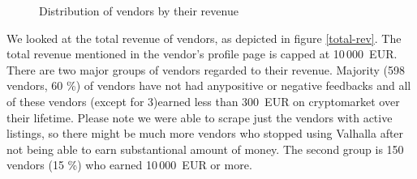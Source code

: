 \documentclass[
  digital, %
  table,   %
  lof,     %
  lot,     %
  oneside
]{fithesis3}
\begin{document}
\begin{figure}[!htb]

    
\caption{Distribution of vendors by their revenue}
\end{figure}

We looked at the total revenue of vendors, as depicted in figure \ref{total-rev}. 
The total revenue mentioned in the vendor's profile page is capped at 10\,000~EUR.
There are two major groups of vendors regarded to their revenue. 
Majority (598 vendors, 60 \%) of vendors have not had any\newline positive or negative feedbacks and all of these vendors
(except for 3)\newline earned less than 300~EUR on cryptomarket over their lifetime.
Please note we were able to scrape just the vendors with active listings,
so there might be much more vendors who stopped using Valhalla after
not being able to earn substantional amount of money.
The second group is 150 vendors (15 \%) who earned 10\,000~EUR or more.
\end{document}
